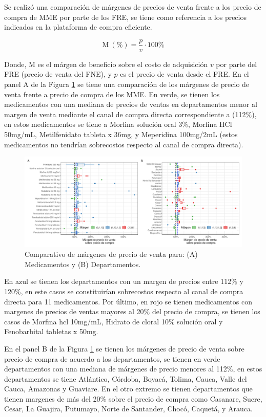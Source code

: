 \documentclass[
]{book}
\begin{document}
Se realizó una comparación de márgenes de precios de venta frente a los precio de compra de MME por parte de los FRE, se tiene como referencia a los precios indicados en la plataforma de compra eficiente.

\[\mathrm{M}~(\%) = \frac{p}{v} \cdot 100\%\]

Donde, \(\mathrm{M}\) es el márgen de beneficio sobre el costo de adquisición \(v\) por parte del FRE (precio de venta del FNE), y \(p\) es el precio de venta desde el FRE. En el panel A de la Figura \ref{fig:boxplotComparativoPVTA} se tiene una comparación de los márgenes de precio de venta frente a precio de compra de los MME. En verde, se tienen los medicamentos con una mediana de precios de ventas en departamentos menor al margen de venta mediante el canal de compra directa correspondiente a (112\%), en estos medicamentos se tiene a Morfina solución oral 3\%, Morfina HCl 50mg/mL, Metilfenidato tableta x 36mg, y Meperidina 100mg/2mL (estos medicamentos no tendrían sobrecostos respecto al canal de compra directa).

\begin{figure}[t]
\includegraphics[width=1\linewidth]{InformeFinal_files/figure-latex/boxplotComparativoPVTA-1} \caption{Comparativo de márgenes de precio de venta para: (A) Medicamentos y (B) Departamentos.}\label{fig:boxplotComparativoPVTA}
\end{figure}

En azul se tienen los departamentos con un margen de precios entre 112\% y 120\%, en este casos se constituirían sobrecostos respecto al canal de compra directa para 11 medicamentos. Por último, en rojo se tienen medicamentos con margenes de precios de ventas mayores al 20\% del precio de compra, se tienen los casos de Morfina hcl 10mg/mL, Hidrato de cloral 10\% solución oral y Fenobarbital tabletas x 50mg.

En el panel B de la Figura \ref{fig:boxplotComparativoPVTA} se tienen los márgenes de precio de venta sobre precio de compra de acuerdo a los departamentos, se tienen en verde departamentos con una mediana de márgenes de precio menores al 112\%, en estos departamentos se tiene Atlántico, Córdoba, Boyacá, Tolima, Cauca, Valle del Cauca, Amazonas y Guaviare. En el otro extremo se tienen departamentos que tienen margenes de más del 20\% sobre el precio de compra como Casanare, Sucre, Cesar, La Guajira, Putumayo, Norte de Santander, Chocó, Caquetá, y Arauca.
\end{document}
